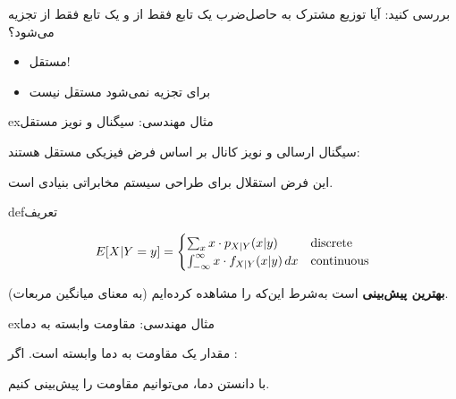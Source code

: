 
بررسی کنید: آیا توزیع مشترک به حاصل‌ضرب یک تابع فقط از  و یک تابع فقط از  تجزیه می‌شود؟

\begin{itemize}
\tightlist
\item
   مستقل!
\item
   برای  تجزیه نمی‌شود \lr{\ensuremath{\to}} مستقل نیست
\end{itemize}

\begin{PSbox}[unbreakable]{ex}{مثال مهندسی: سیگنال و نویز مستقل}

سیگنال ارسالی  و نویز کانال  بر اساس فرض فیزیکی مستقل هستند:\PSbr{}

این فرض استقلال برای طراحی سیستم مخابراتی بنیادی است.

\end{PSbox}


\begin{PSbox}[unbreakable]{def}{تعریف}

\[E[X|Y=y] = \begin{cases} \sum_x x \cdot p_{X|Y}(x|y) & \text{discrete} \\ \int_{-\infty}^{\infty} x \cdot f_{X|Y}(x|y) \, dx & \text{continuous} \end{cases}\]

\end{PSbox}


 \textbf{بهترین پیش‌بینی}  است به‌شرط این‌که  را مشاهده کرده‌ایم (به معنای میانگین مربعات).

\begin{PSbox}[unbreakable]{ex}{مثال مهندسی: مقاومت وابسته به دما}

مقدار یک مقاومت  به دما  وابسته است. اگر :


با دانستن دما، می‌توانیم مقاومت را پیش‌بینی کنیم.

\end{PSbox}

